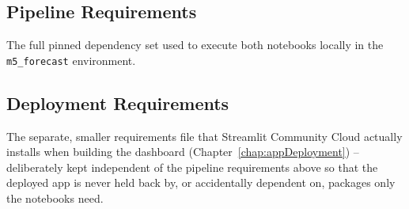 

\subsection{Pipeline Requirements}
\label{sec:requirementsListing}

The full pinned dependency set used to execute both notebooks locally in the \texttt{m5\_forecast} environment.



\subsection{Deployment Requirements}
\label{sec:appRequirementsListing}

The separate, smaller requirements file that Streamlit Community Cloud actually installs when building the dashboard (Chapter~\ref{chap:appDeployment}) -- deliberately kept independent of the pipeline requirements above so that the deployed app is never held back by, or accidentally dependent on, packages only the notebooks need.

